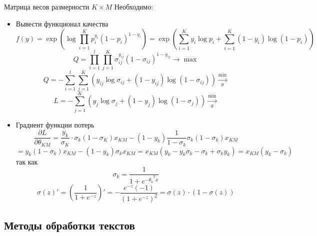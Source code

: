 \documentclass[%
10pt, %
final, %
oneside, %
onecolumn, %
centertags]{article} %
\theoremstyle{plain}
\theoremstyle{definition}
\theoremstyle{remark}
\begin{document}
Матрица весов размерности $K \times M$
Необходимо:
\begin{itemize}
	\item Вывести функционал качества
	$$f(y) = \exp \left(\log \prod\limits_{i=1}^K p_i^{y_i}(1-p_i)^{1-y_i}\right) = \exp\left(\sum\limits_{i=1}^K y_i \log p_i + \sum\limits_{i=1}^K (1-y_i) \log (1-p_i)\right)$$
	$$Q = \prod\limits_{i=1}^l \prod\limits_{j=1}^K \sigma_{ij}^{y_{ij}}(1-\sigma_{ij})^{1-y_{ij}} \to \max$$
	$$Q = -\sum\limits_{i=1}^l \sum\limits_{j=1}^K \left(y_{ij}\log \sigma_{ij}+(1-y_{ij})\log (1-\sigma_{ij})\right)\xrightarrow[\theta]{\min}$$
	$$L = - \sum\limits_{j=1}^K \left(y_{j}\log \sigma_{j}+(1-y_{j})\log (1-\sigma_{j})\right)\xrightarrow[\theta]{\min}$$
	\item Градиент функции потерь
	$$\frac{\partial L}{\partial \theta_{KM}} = \frac{y_k}{\sigma_{K}} \cdot \sigma_k(1-\sigma_K)x_{KM} - (1-y_k)\frac{1}{1-\sigma_k}\sigma_k (1-\sigma_k) x_{KM} $$
	$$ = y_k(1-\sigma_k)x_{KM} - (1-y_k)\sigma_k x_{KM} = x_{KM}(y_k-y_k\sigma_k-\sigma_k+\sigma_k y_k) = x_{KM}(y_k-\sigma_k)$$
	так как
	$$\sigma_k = \frac{1}{1+e^{-\overline{\theta_k}^T \overline{x}}}$$
	$$\sigma(z)' = \left(\frac{1}{1+e^{-z}}\right)' = - \frac{e^{-z}(-1)}{(1+e^{-z})^2} = \sigma(z) \cdot (1-\sigma(z))$$

\end{itemize}

\subsection{Методы обработки текстов}
\end{document}
